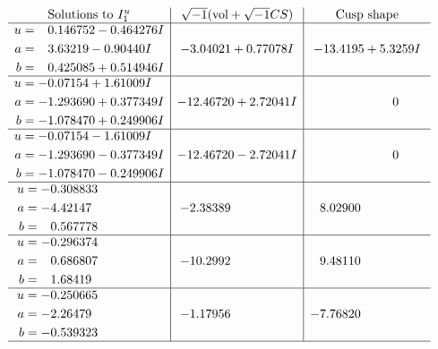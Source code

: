 \documentclass[1p]{elsarticle_modified}
\theoremstyle{definition}
\newcommand{\I}{\sqrt{-1}}
\begin{document}
$$\begin{array}{c|c|c}
\text{Solutions to }I^u_{1}& \I (\text{vol} + \sqrt{-1}CS) & \text{Cusp shape}\\
 \hline 
\begin{aligned}
u &= \phantom{-}0.146752 - 0.464276 I \\
a &= \phantom{-}3.63219 - 0.90440 I \\
b &= \phantom{-}0.425085 + 0.514946 I\end{aligned}
 & -3.04021 + 0.77078 I & -13.4195 + 5.3259 I \\ \hline\begin{aligned}
u &= -0.07154 + 1.61009 I \\
a &= -1.293690 + 0.377349 I \\
b &= -1.078470 + 0.249906 I\end{aligned}
 & -12.46720 + 2.72041 I & \phantom{-0.000000 } 0 \\ \hline\begin{aligned}
u &= -0.07154 - 1.61009 I \\
a &= -1.293690 - 0.377349 I \\
b &= -1.078470 - 0.249906 I\end{aligned}
 & -12.46720 - 2.72041 I & \phantom{-0.000000 } 0 \\ \hline\begin{aligned}
u &= -0.308833\phantom{ +0.000000I} \\
a &= -4.42147\phantom{ +0.000000I} \\
b &= \phantom{-}0.567778\phantom{ +0.000000I}\end{aligned}
 & -2.38389\phantom{ +0.000000I} & \phantom{-}8.02900\phantom{ +0.000000I} \\ \hline\begin{aligned}
u &= -0.296374\phantom{ +0.000000I} \\
a &= \phantom{-}0.686807\phantom{ +0.000000I} \\
b &= \phantom{-}1.68419\phantom{ +0.000000I}\end{aligned}
 & -10.2992\phantom{ +0.000000I} & \phantom{-}9.48110\phantom{ +0.000000I} \\ \hline\begin{aligned}
u &= -0.250665\phantom{ +0.000000I} \\
a &= -2.26479\phantom{ +0.000000I} \\
b &= -0.539323\phantom{ +0.000000I}\end{aligned}
 & -1.17956\phantom{ +0.000000I} & -7.76820\phantom{ +0.000000I}\\
 \hline 
 \end{array}$$\newpage\newpage\renewcommand{\arraystretch}{1}
\end{document}
